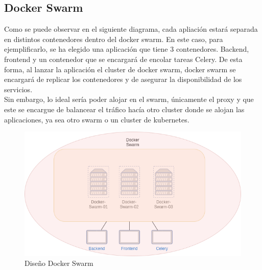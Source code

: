 	\subsection{Docker Swarm}
	\begin{paragraph}
		Como se puede observar en el siguiente diagrama, cada apliación estará separada en distintos contenedores dentro del docker swarm. En este caso, para ejemplificarlo, se ha elegido una aplicación que tiene 3 contenedores. Backend, frontend y un contenedor que se encargará de encolar tareas Celery. De esta forma, al lanzar la aplicación el cluster de docker swarm, docker swarm se encargará de replicar los contenedores y de asegurar la disponibilidad de los servicios. \\
		Sin embargo, lo ideal sería poder alojar en el swarm, únicamente el proxy y que este se encargue de balancear el tráfico hacía otro cluster donde se alojan las aplicaciones, ya sea otro swarm o un cluster de kubernetes.
		
		\begin{figure}[!hbt]
			\centering
			\includegraphics[scale=0.37]{imagenes/Diseno/diagrama_docker_swarm.png}
			\caption[Diseño Docker Swarm]{Diseño Docker Swarm} 
			\label{docker_swarm_design}
		\end{figure}
		
	\end{paragraph}
